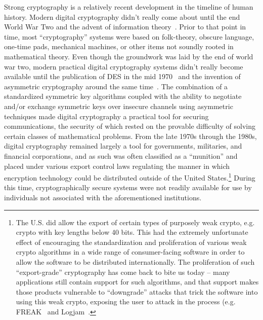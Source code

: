 Strong cryptography is a relatively recent development in the timeline
of human history. Modern digital cryptography didn't really come about
until the end World War Two and the advent of information
theory~\cite{shannon1945}. Prior to that point in time, most
``cryptography'' systems were based on folk-theory, obscure language,
one-time pads, mechanical machines, or other items not soundly rooted
in mathematical theory. Even though the groundwork was laid by the end
of world war two, modern practical digital cryptography systems didn't
really become available until the publication of DES in the mid
1970~\cite{fips46} and the invention of asymmetric cryptography around
the same time~\cite{diffie1976}. The combination of a standardized
symmetric key algorithms coupled with the ability to negotiate and/or
exchange symmetric keys over insecure channels using asymmetric
techniques made digital cryptography a practical tool for securing
communications, the security of which rested on the provable
difficulty of solving certain classes of mathematical problems. From
the late 1970s through the 1980s, digital cryptography remained
largely a tool for governments, militaries, and financial
corporations, and as such was often classified as a ``munition'' and
placed under various export control laws regulating the manner in
which encryption technology could be distributed outside of the United
States.\footnote{The U.S. did allow the export of certain types of
  purposely weak crypto, e.g. crypto with key lengths below 40
  bits. This had the extremely unfortunate effect of encouraging the
  standardization and proliferation of various weak crypto algorithms in a
  wide range of consumer-facing software in order to allow the
  software to be distributed internationally. The proliferation of such
  ``export-grade'' cryptography has come back to bite us today -- many
  applications still contain support for such algorithms, and that
  support makes those products vulnerable to ``downgrade'' attacks that
  trick the software into using this weak crypto, exposing the user to
  attack in the process (e.g. FREAK~\cite{beurdouche2015} and
  Logjam~\cite{adrian2015}.} During this time, cryptographically
secure systems were not readily available for use by individuals not
associated with the aforementioned institutions.

